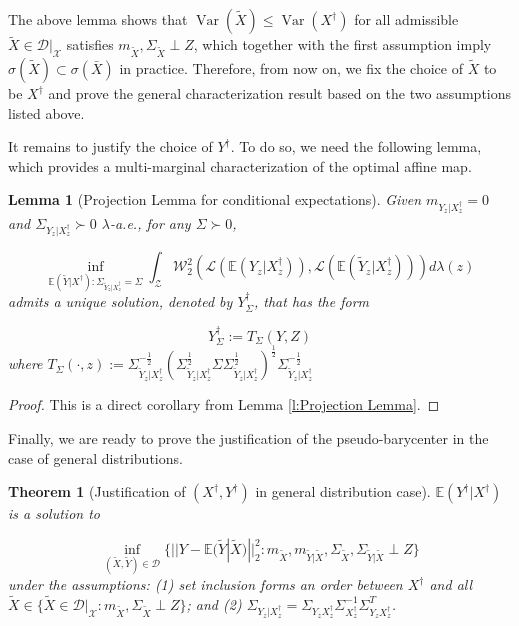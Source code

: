 \documentclass[twoside,11pt]{article}
\newtheorem{thm}{Theorem}[section]{\bfseries}{\itshape}
\newtheorem{lem}{Lemma}[section]{\bfseries}{\itshape}
\DeclareMathOperator{\var}{Var}
\begin{document}
The above lemma shows that $\var(\tilde{X}) \leq \var(X^{\dag})$ for all admissible $\tilde{X} \in \mathcal{D}|_{\mathcal{X}}$ satisfies $m_{\tilde{X}},  \Sigma_{\tilde{X}} \perp Z$, which together with the first assumption imply $\sigma(\tilde{X}) \subset \sigma(\bar{X})$ in practice. Therefore, from now on, we fix the choice of $\tilde{X}$ to be $X^{\dag}$ and prove the general characterization result based on the two assumptions listed above.

It remains to justify the choice of $Y^{\dag}$. To do so, we need the following lemma, which provides a multi-marginal characterization of the optimal affine map.

\begin{lem}[Projection Lemma for conditional expectations]\label{l:Projection Lemma for Conditional Expectations}
Given $m_{Y_z|X^{\dag}_z} = 0$ and $\Sigma_{Y_z|X^{\dag}_z} \succ 0$ $\lambda$-a.e., for any $\Sigma \succ 0$,

\begin{equation}
\inf_{\mathbb{E}(\tilde{Y}|X^{\dag}): \Sigma_{\tilde{Y}_z|X^{\dag}_z} = \Sigma} \int_{\mathcal{Z}} \mathcal{W}^2_2(\mathcal{L}(\mathbb{E}(Y_z|X^{\dag}_z)),  \mathcal{L}(\mathbb{E}(\tilde{Y}_z|X^{\dag}_z))) d\lambda(z)
\end{equation}
admits a unique solution, denoted by $Y^{\dag}_{\Sigma}$, that has the form 

\begin{equation}
Y^{\dag}_{\Sigma} := T_{\Sigma}(Y,Z)
\end{equation}
where $T_{\Sigma}(\cdot,z) := \Sigma_{\tilde{Y}_z|X^{\dag}_z}^{-\frac{1}{2}} (\Sigma_{\tilde{Y}_z|X^{\dag}_z}^{\frac{1}{2}} \Sigma  \Sigma_{\tilde{Y}_z|X^{\dag}_z}^{\frac{1}{2}})^{\frac{1}{2}} \Sigma_{\tilde{Y}_z|X^{\dag}_z}^{-\frac{1}{2}}$

\end{lem}

\begin{proof}
This is a direct corollary from Lemma \ref{l:Projection Lemma}.
\end{proof}

Finally, we are ready to prove the justification of the pseudo-barycenter in the case of general distributions.

\begin{thm}[Justification of $(X^{\dag}, Y^{\dag})$ in general distribution case]\label{th:Justification of Pseudo-Barycenter in General Distribution Case}
$\mathbb{E}(Y^{\dag} |X^{\dag})$ is a solution to

\begin{equation}
\inf_{(\tilde{X},\tilde{Y}) \in \mathcal{D}}  \{ ||Y - \mathbb{E}(\tilde{Y}|\tilde{X})||^2_2: m_{\tilde{X}}, m_{\tilde{Y}|\tilde{X}}, \Sigma_{\tilde{X}}, \Sigma_{\tilde{Y}|\tilde{X}} \perp Z\}
\end{equation}
under the assumptions: (1) set inclusion forms an order between $X^{\dag}$ and all $\tilde{X} \in \{\tilde{X} \in \mathcal{D}|_{\mathcal{X}} : m_{\tilde{X}}, \Sigma_{\tilde{X}} \perp Z\}$; and (2) $\Sigma_{Y_z|X^{\dag}_z} = \Sigma_{Y_z X^{\dag}_z} \Sigma_{X^{\dag}_z}^{-1} \Sigma_{Y_z X^{\dag}_z}^T$.

\end{thm}
\end{document}
